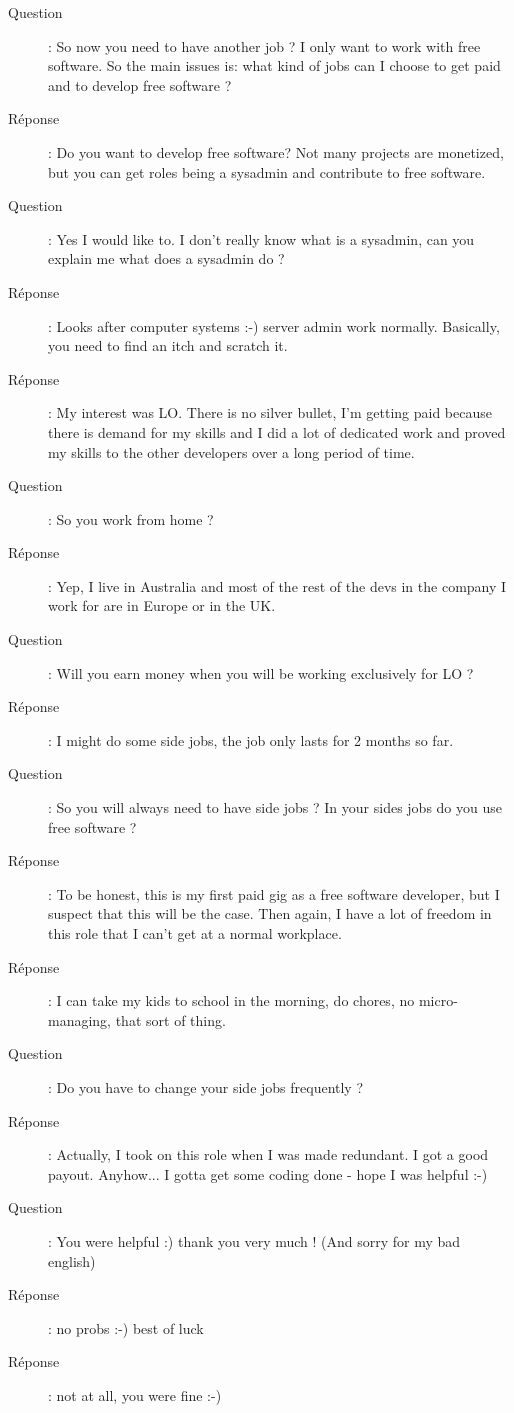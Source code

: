 \documentclass[a4paper,12pt, draft]{report}
\begin{document}
\begin{description}
\item [Question]:  So now you need to have another job ? I  only want to work with free software. So the main issues is: what kind of jobs can I choose to get paid and to develop free software ?
\item [Réponse]:  Do you want to develop free software? Not many projects are monetized, but you can get roles being a sysadmin and contribute to free software.
\item [Question]:  Yes I would like to. I don't really know what is a sysadmin, can you explain me what does a sysadmin do ?
\item [Réponse]:  Looks after computer systems :-) server admin work normally. Basically, you need to find an itch and scratch it.
\item [Réponse]:  My interest was LO. There is no silver bullet, I'm getting paid because there is demand for my skills and I did a lot of dedicated work and proved my skills to the other developers over a long period of time.
\item [Question]:  So you work from home ?
\item [Réponse]:  Yep, I live in Australia and most of the rest of the devs in the company I work for are in Europe or in the UK.
\item [Question]:  Will you earn money when you will be working exclusively for LO ?
\item [Réponse]:  I might do some side jobs, the job only lasts for 2 months so far.
\item [Question]:  So you will always need to have side jobs ? In your sides jobs do you use free software ?
\item [Réponse]:  To be honest, this is my first paid gig as a free software developer, but I suspect that this will be the case. Then again, I have a lot of freedom in this role that I can't get at a normal workplace.
\item [Réponse]:  I can take my kids to school in the morning, do chores, no micro-managing, that sort of thing.
\item [Question]:  Do you have to change your side jobs frequently ?
\item [Réponse]:  Actually, I took on this role when I was made redundant. I got a good payout. Anyhow... I gotta get some coding done - hope I was helpful :-)
\item [Question]:  You were helpful :) thank you very much ! (And sorry for my bad english)
\item [Réponse]:  no probs :-) best of luck
\item [Réponse]:  not at all, you were fine :-)

\end{description}
\end{document}
